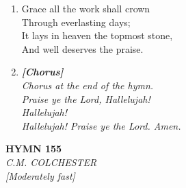 \begin{enumerate}
    \item Grace all the work shall crown \\
        Through everlasting days; \\
        It lays in heaven the topmost stone, \\
        And well deserves the praise.

    \item[] \vspace{0.4em}
    \textbf{\textit{[Chorus]}} \\
    \textit{Chorus at the end of the hymn.} \\
    \textit{Praise ye the Lord, Hallelujah!} \\
    \textit{Hallelujah!} \\
    \textit{Hallelujah! Praise ye the Lord. Amen.}
    \vspace{0.4em}

\end{enumerate}

\newpage
\begin{center}
    {\Large \textbf{HYMN 155}}
    \\
    \textit{C.M. COLCHESTER}
    \\
    \textit{\small [Moderately fast]}
\end{center}
\vspace{1em}

